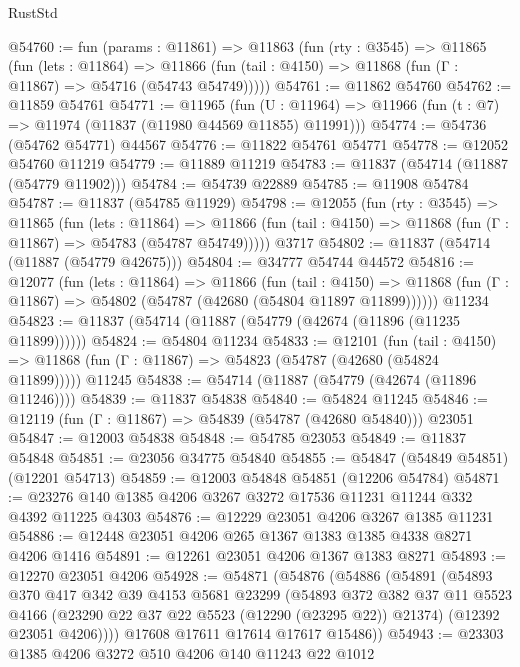 \begin{lexlean}{RustStd}
\begin{coremodule}
@54760 := fun (params : @11861) =>
  @11863
    (fun (rty : @3545) =>
    @11865
      (fun (lets : @11864) =>
      @11866 (fun (tail : @4150) => @11868 (fun (Γ : @11867) => @54716 (@54743 @54749)))))
@54761 := @11862 @54760
@54762 := @11859 @54761
@54771 := @11965
    (fun (U : @11964) => @11966 (fun (t : @7) => @11974 (@11837 (@11980 @44569 @11855) @11991)))
@54774 := @54736 (@54762 @54771) @44567
@54776 := @11822 @54761 @54771
@54778 := @12052 @54760 @11219
@54779 := @11889 @11219
@54783 := @11837 (@54714 (@11887 (@54779 @11902)))
@54784 := @54739 @22889
@54785 := @11908 @54784
@54787 := @11837 (@54785 @11929)
@54798 := @12055
    (fun (rty : @3545) =>
    @11865
      (fun (lets : @11864) =>
      @11866 (fun (tail : @4150) => @11868 (fun (Γ : @11867) => @54783 (@54787 @54749)))))
    @3717
@54802 := @11837 (@54714 (@11887 (@54779 @42675)))
@54804 := @34777 @54744 @44572
@54816 := @12077
    (fun (lets : @11864) =>
    @11866
      (fun (tail : @4150) =>
      @11868 (fun (Γ : @11867) => @54802 (@54787 (@42680 (@54804 @11897 @11899))))))
    @11234
@54823 := @11837 (@54714 (@11887 (@54779 (@42674 (@11896 (@11235 @11899))))))
@54824 := @54804 @11234
@54833 := @12101
    (fun (tail : @4150) => @11868 (fun (Γ : @11867) => @54823 (@54787 (@42680 (@54824 @11899)))))
    @11245
@54838 := @54714 (@11887 (@54779 (@42674 (@11896 @11246))))
@54839 := @11837 @54838
@54840 := @54824 @11245
@54846 := @12119 (fun (Γ : @11867) => @54839 (@54787 (@42680 @54840))) @23051
@54847 := @12003 @54838
@54848 := @54785 @23053
@54849 := @11837 @54848
@54851 := @23056 @34775 @54840
@54855 := @54847 (@54849 @54851) (@12201 @54713)
@54859 := @12003 @54848 @54851 (@12206 @54784)
@54871 := @23276 @140 @1385 @4206 @3267 @3272 @17536 @11231 @11244 @332 @4392 @11225 @4303
@54876 := @12229 @23051 @4206 @3267 @1385 @11231
@54886 := @12448 @23051 @4206 @265 @1367 @1383 @1385 @4338 @8271 @4206 @1416
@54891 := @12261 @23051 @4206 @1367 @1383 @8271
@54893 := @12270 @23051 @4206
@54928 := @54871
    (@54876
      (@54886
        (@54891
          (@54893
            @370
            @417
            @342
            @39
            @4153
            @5681
            @23299
            (@54893
              @372
              @382
              @37
              @11
              @5523
              @4166
              (@23290 @22 @37 @22 @5523 (@12290 (@23295 @22)) @21374)
              (@12392 @23051 @4206))))
        @17608
        @17611
        @17614
        @17617
        @15486))
@54943 := @23303
    @1385
    @4206
    @3272
    @510
    @4206
    @140
    @11243
    @22
    @1012

\end{coremodule}
\end{lexlean}
